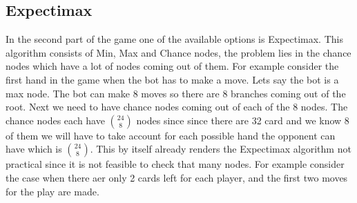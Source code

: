 \subsection{Expectimax}
\hspace{\parindent} In the second part of the game one of the available options is Expectimax.
This algorithm consists of Min, Max and Chance nodes, the problem lies in the chance nodes which have a lot of nodes coming out of them.
For example consider the first hand in the game when the bot has to make a move. Lets say the bot is a max node.
The bot can make 8 moves so there are 8 branches coming out of the root. Next we need to have chance nodes coming out of each of the 8 nodes.
The chance nodes each have $\binom{24}{8}$ nodes since since there are 32 card and we know 8 of them we will have to take account for each possible hand the opponent can have which is $\binom{24}{8}$. 
This by itself already renders the  Expectimax algorithm not practical since it is not feasible to check that many nodes.
For example consider the case when there aer only 2 cards left for each player, and the first two moves for the play are made.


